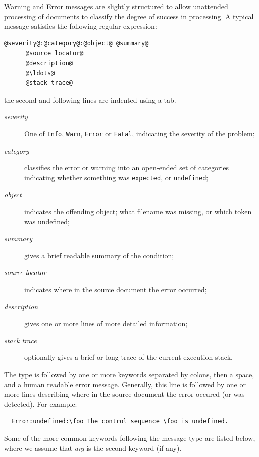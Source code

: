 \documentclass{book}
\begin{document}
Warning and Error messages are slightly structured to allow
unattended processing of documents to classify the degree
of success in processing. A typical message satisfies the following regular expression:
\begin{lstlisting}[escapechar=@,basicstyle=\ttfamily\small]
  @severity@:@category@:@object@ @summary@  
      @source locator@
      @description@
      @\ldots@
      @stack trace@
\end{lstlisting}
the second and following lines are indented using a tab.
\begin{description}
\item[\textit{severity}] One of \texttt{Info}, \texttt{Warn}, \texttt{Error} or \texttt{Fatal},
  indicating the severity of the problem;
\item[\textit{category}] classifies the error or warning into an open-ended set
   of categories  indicating whether something was \texttt{expected}, or \texttt{undefined};
\item[\textit{object}] indicates the offending object; what filename was missing,
  or which token was undefined;
\item[\textit{summary}] gives a brief readable summary of the condition;
\item[\textit{source locator}] indicates where in the source document the error occurred;
\item[\textit{description}] gives one or more lines of more detailed information;
\item[\textit{stack trace}] optionally gives a brief or long trace of the current execution stack.
\end{description}
The type is followed by one or more keywords separated by colons,
then a space, and a human readable error message.
Generally, this line is followed by one or more lines describing
where in the source document the error occured (or was detected).
For example:
{\small
\begin{verbatim}
  Error:undefined:\foo The control sequence \foo is undefined.
\end{verbatim}
}
Some of the more common keywords following the message type are listed below,
where we assume that \textit{arg} is the second keyword (if any).
\end{document}
